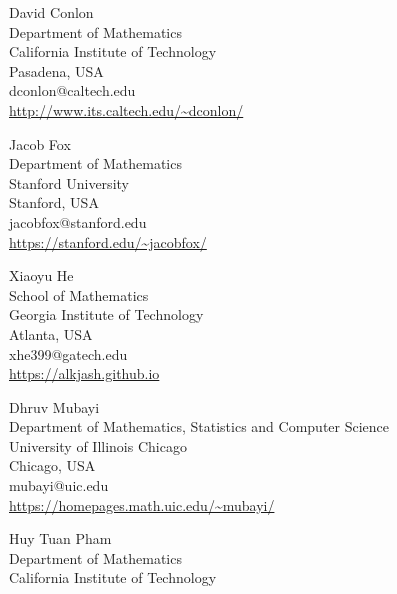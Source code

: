 \documentclass{daj}
\begin{document}
\begin{dajauthors}
\begin{authorinfo}[dc]
  David Conlon\\
  Department of Mathematics\\
  California Institute of Technology\\
  Pasadena, USA\\
  dconlon@caltech.edu \\
  \url{http://www.its.caltech.edu/~dconlon/}
\end{authorinfo}
\begin{authorinfo}[jf]
  Jacob Fox\\
  Department of Mathematics\\ 
  Stanford University\\
  Stanford, USA\\
  jacobfox@stanford.edu \\
  \url{https://stanford.edu/~jacobfox/}
\end{authorinfo}
\begin{authorinfo}[xh]
  Xiaoyu He\\
  School of Mathematics\\ 
  Georgia Institute of Technology\\ 
  Atlanta, USA\\
  xhe399@gatech.edu\\
  \url{https://alkjash.github.io}
\end{authorinfo}
\begin{authorinfo}[dm]
  Dhruv Mubayi\\
  Department of Mathematics, Statistics and Computer Science\\ 
  University of Illinois Chicago\\ 
  Chicago, USA\\
  mubayi@uic.edu \\
  \url{https://homepages.math.uic.edu/~mubayi/}
\end{authorinfo}
\begin{authorinfo}[htp]
  Huy Tuan Pham\\
  Department of Mathematics\\
  California Institute of Technology\\

\end{authorinfo}
\end{dajauthors}
\end{document}

